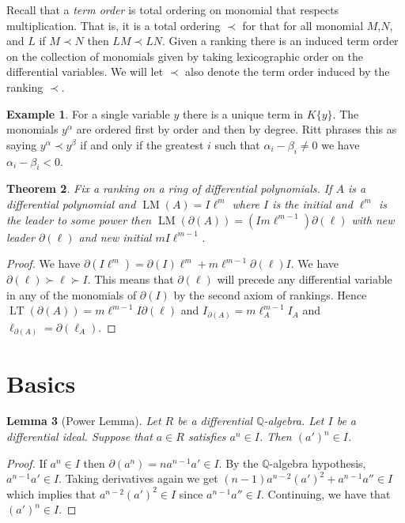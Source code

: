 \documentclass[]{article}
\numberwithin{equation}{section}
\newtheorem{theorem}{Theorem}[subsection]
\newtheorem{lemma}[theorem]{Lemma}
\theoremstyle{definition}
\newtheorem{example}[theorem]{Example}
\theoremstyle{remark}
\newcommand{\QQ}{\mathbb{Q}}
\newcommand{\LM}{\operatorname{LM}}
\newcommand{\LT}{\operatorname{LT}}
\begin{document}
Recall that a \emph{term order} is total ordering on monomial that respects multiplication. 
That is, it is a total ordering $\prec$ for that for all monomial $M$,$N$, and $L$ if $M\prec N$ then $LM \prec LN$. 
Given a ranking there is an induced term order on the collection of monomials given by taking lexicographic order on the differential variables. 
We will let $\prec$ also denote the term order induced by the ranking $\prec$. 

\begin{example}
	For a single variable $y$ there is a unique term in $K\lbrace y \rbrace$. 
	The monomials $y^{\alpha}$ are ordered first by order and then by degree. 
	Ritt phrases this as saying $y^{\alpha} \prec y^{\beta}$ if and only if the greatest $i$ such that $\alpha_i - \beta_i \neq 0$ we have $\alpha_i -\beta_i <0$.  
	
\end{example}

\begin{theorem}
	Fix a ranking on a ring of differential polynomials.
	If $A$ is a differential polynomial and $\LM(A) = I \ell^m$ where $I$ is the initial and $\ell^m$ is the leader to some power then $\LM(\partial(A)) = (I m \ell^{m-1}) \partial(\ell)$ with new leader $\partial(\ell)$ and new initial $mI\ell^{m-1}$.
\end{theorem}
\begin{proof}
	We have $\partial(I \ell^m) = \partial(I)\ell^m + m\ell^{m-1}\partial(\ell)I$. 
	We have $\partial(\ell) \succ \ell \succ I$. 
	This means that $\partial(\ell)$ will precede any differential variable in any of the monomials of $\partial(I)$ by the second axiom of rankings.
	Hence $\LT(\partial(A) ) = m\ell^{m-1}I \partial(\ell)$ and $I_{\partial(A)} = m \ell_A^{m-1} I_A$ and $\ell_{\partial(A)} = \partial(\ell_A)$.
\end{proof}


\section{Basics}

\begin{lemma}[Power Lemma]\label{lem:power-lemma}
	Let $R$ be a differential $\QQ$-algebra. 
	Let $I$ be a differential ideal. 
	Suppose that $a\in R$ satisfies $a^n \in I$. 
	Then $(a')^{n} \in I$. 
\end{lemma}
\begin{proof}
    If $a^n \in I$ then $\partial(a^n) = n a^{n-1} a' \in I$. 
    By the $\QQ$-algebra hypothesis, $a^{n-1}a' \in I$. 
    Taking derivatives again we get $(n-1)a^{n-2}(a')^2 + a^{n-1}a'' \in I$ which implies that $a^{n-2} (a')^2 \in I$ since $a^{n-1}a'' \in I$. 
    Continuing, we have that $(a')^n \in I$. 	
\end{proof}
\end{document}
